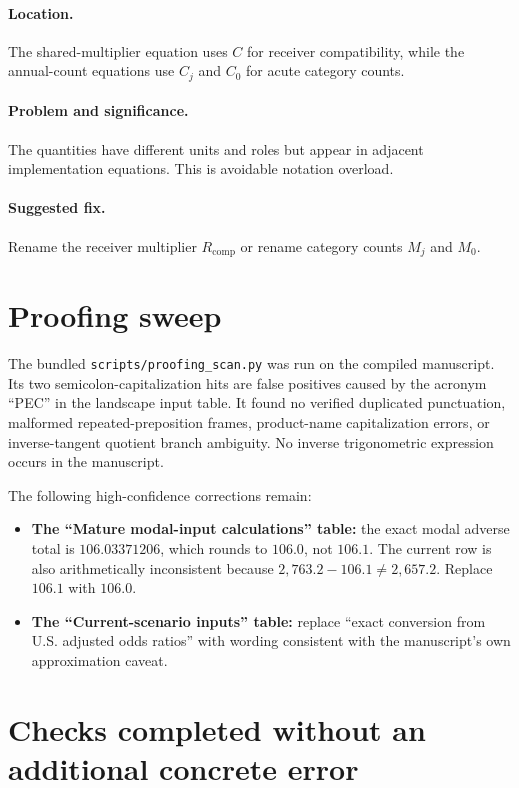 \documentclass[11pt]{article}
\begin{document}
\paragraph{Location.}
The shared-multiplier equation uses $C$ for receiver compatibility, while the
annual-count equations use $C_j$ and $C_0$ for acute category counts.

\paragraph{Problem and significance.}
The quantities have different units and roles but appear in adjacent
implementation equations.  This is avoidable notation overload.

\paragraph{Suggested fix.}
Rename the receiver multiplier $R_{\mathrm{comp}}$ or rename category counts
$M_j$ and $M_0$.

\section*{Proofing sweep}

The bundled \texttt{scripts/proofing\_scan.py} was run on the compiled
manuscript.  Its two semicolon-capitalization hits are false positives caused
by the acronym ``PEC'' in the landscape input table.  It found no verified
duplicated punctuation, malformed repeated-preposition frames, product-name
capitalization errors, or inverse-tangent quotient branch ambiguity.  No inverse
trigonometric expression occurs in the manuscript.

The following high-confidence corrections remain:
\begin{itemize}
\item \textbf{The ``Mature modal-input calculations'' table:} the exact modal adverse total is
$106.03371206$, which rounds to $106.0$, not $106.1$.  The current row is also
arithmetically inconsistent because $2{,}763.2-106.1\neq2{,}657.2$.  Replace
$106.1$ with $106.0$.
\item \textbf{The ``Current-scenario inputs'' table:} replace ``exact conversion from
U.S. adjusted odds ratios'' with wording consistent with the manuscript's own
approximation caveat.
\end{itemize}

\section*{Checks completed without an additional concrete error}
\end{document}
